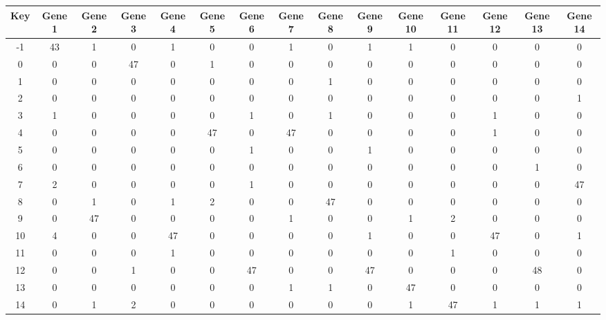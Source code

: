 \begin{tabular}{|c|c|c|c|c|c|c|c|c|c|c|c|c|c|c|}
\hline
Key & Gene 1 & Gene 2 & Gene 3 & Gene 4 & Gene 5 & Gene 6 & Gene 7 & Gene 8 & Gene 9 & Gene 10 & Gene 11 & Gene 12 & Gene 13 & Gene 14 \\
\hline
-1 & 43 & 1 & 0 & 1 & 0 & 0 & 1 & 0 & 1 & 1 & 0 & 0 & 0 & 0 \\
0 & 0 & 0 & 47 & 0 & 1 & 0 & 0 & 0 & 0 & 0 & 0 & 0 & 0 & 0 \\
1 & 0 & 0 & 0 & 0 & 0 & 0 & 0 & 1 & 0 & 0 & 0 & 0 & 0 & 0 \\
2 & 0 & 0 & 0 & 0 & 0 & 0 & 0 & 0 & 0 & 0 & 0 & 0 & 0 & 1 \\
3 & 1 & 0 & 0 & 0 & 0 & 1 & 0 & 1 & 0 & 0 & 0 & 1 & 0 & 0 \\
4 & 0 & 0 & 0 & 0 & 47 & 0 & 47 & 0 & 0 & 0 & 0 & 1 & 0 & 0 \\
5 & 0 & 0 & 0 & 0 & 0 & 1 & 0 & 0 & 1 & 0 & 0 & 0 & 0 & 0 \\
6 & 0 & 0 & 0 & 0 & 0 & 0 & 0 & 0 & 0 & 0 & 0 & 0 & 1 & 0 \\
7 & 2 & 0 & 0 & 0 & 0 & 1 & 0 & 0 & 0 & 0 & 0 & 0 & 0 & 47 \\
8 & 0 & 1 & 0 & 1 & 2 & 0 & 0 & 47 & 0 & 0 & 0 & 0 & 0 & 0 \\
9 & 0 & 47 & 0 & 0 & 0 & 0 & 1 & 0 & 0 & 1 & 2 & 0 & 0 & 0 \\
10 & 4 & 0 & 0 & 47 & 0 & 0 & 0 & 0 & 1 & 0 & 0 & 47 & 0 & 1 \\
11 & 0 & 0 & 0 & 1 & 0 & 0 & 0 & 0 & 0 & 0 & 1 & 0 & 0 & 0 \\
12 & 0 & 0 & 1 & 0 & 0 & 47 & 0 & 0 & 47 & 0 & 0 & 0 & 48 & 0 \\
13 & 0 & 0 & 0 & 0 & 0 & 0 & 1 & 1 & 0 & 47 & 0 & 0 & 0 & 0 \\
14 & 0 & 1 & 2 & 0 & 0 & 0 & 0 & 0 & 0 & 1 & 47 & 1 & 1 & 1 \\
\hline
\end{tabular}